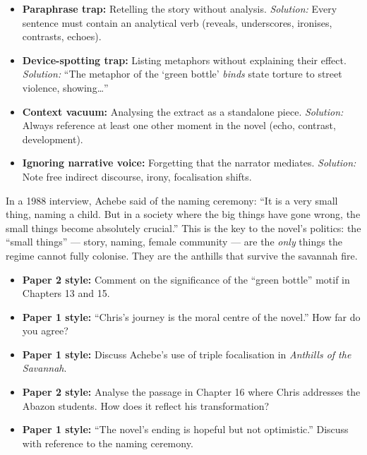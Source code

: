 \documentclass[11pt]{article}
\begin{document}
\begin{attention}
\begin{itemize}
\item \textbf{Paraphrase trap:} Retelling the story without analysis. \emph{Solution:} Every sentence must contain an analytical verb (reveals, underscores, ironises, contrasts, echoes).
\item \textbf{Device-spotting trap:} Listing metaphors without explaining their effect. \emph{Solution:} “The metaphor of the ‘green bottle’ \emph{binds} state torture to street violence, showing…”
\item \textbf{Context vacuum:} Analysing the extract as a standalone piece. \emph{Solution:} Always reference at least one other moment in the novel (echo, contrast, development).
\item \textbf{Ignoring narrative voice:} Forgetting that the narrator mediates. \emph{Solution:} Note free indirect discourse, irony, focalisation shifts.
\end{itemize}
\end{attention}

\begin{savaistu}
In a 1988 interview, Achebe said of the naming ceremony: “It is a very small thing, naming a child. But in a society where the big things have gone wrong, the small things become absolutely crucial.” This is the key to the novel’s politics: the “small things” — story, naming, female community — are the \emph{only} things the regime cannot fully colonise. They are the anthills that survive the savannah fire.
\end{savaistu}

\begin{exercice}
\begin{itemize}
\item \textbf{Paper 2 style:} Comment on the significance of the “green bottle” motif in Chapters 13 and 15.
\item \textbf{Paper 1 style:} “Chris’s journey is the moral centre of the novel.” How far do you agree?
\item \textbf{Paper 1 style:} Discuss Achebe’s use of triple focalisation in \emph{Anthills of the Savannah}.
\item \textbf{Paper 2 style:} Analyse the passage in Chapter 16 where Chris addresses the Abazon students. How does it reflect his transformation?
\item \textbf{Paper 1 style:} “The novel’s ending is hopeful but not optimistic.” Discuss with reference to the naming ceremony.
\end{itemize}
\end{exercice}
\end{document}
